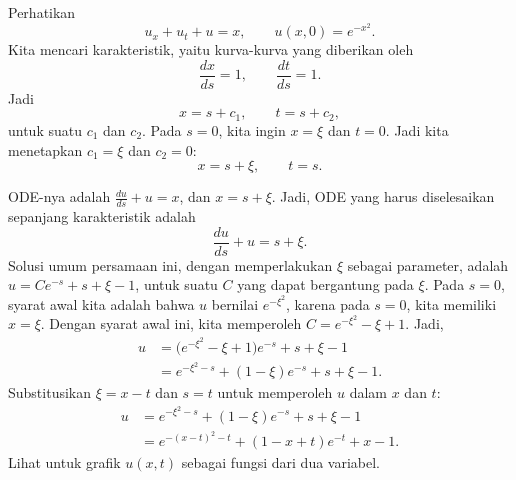 \begin{example}
Perhatikan
\begin{equation*}
u_x + u_t + u = x, \qquad u(x,0) = e^{-x^2} .
\end{equation*}
Kita mencari karakteristik, yaitu kurva-kurva yang diberikan oleh
\begin{equation*}
\frac{dx}{ds} = 1, \qquad \frac{dt}{ds} = 1 .
\end{equation*}
Jadi
\begin{equation*}
x = s + c_1, \qquad t = s+ c_2 ,
\end{equation*}
untuk suatu $c_1$ dan $c_2$.
Pada $s=0$, kita ingin $x=\xi$ dan $t=0$.  Jadi
kita menetapkan $c_1 = \xi$ dan $c_2 = 0$:
\begin{equation*}
x = s + \xi, \qquad t = s .
\end{equation*}

ODE-nya adalah $\frac{du}{ds} + u = x$, dan $x = s+\xi$. Jadi, ODE
yang harus diselesaikan sepanjang karakteristik adalah
\begin{equation*}
\frac{du}{ds} + u = s+ \xi .
\end{equation*}
Solusi umum persamaan ini, dengan memperlakukan $\xi$ sebagai parameter, adalah
$u = C e^{-s}+s+\xi-1$, untuk suatu $C$ yang dapat bergantung pada $\xi$.
Pada $s=0$, syarat awal kita adalah bahwa $u$ bernilai
$e^{-\xi^2}$, karena pada $s=0$, kita memiliki $x=\xi$.
Dengan syarat awal ini, kita memperoleh $C=e^{-\xi^2} - \xi +1$.  Jadi,
\begin{equation*}
\begin{split}
u & =
\bigl(e^{-\xi^2} - \xi +1\bigr) e^{-s}+s+\xi-1
\\
& =
e^{-\xi^2-s} + (1 - \xi) e^{-s} +s+\xi-1 .
\end{split}
\end{equation*}
Substitusikan $\xi = x-t$ dan $s=t$ untuk memperoleh $u$ dalam $x$ dan $t$:
\begin{equation*}
\begin{split}
u
& =
e^{-\xi^2-s} + (1 - \xi) e^{-s} +s+\xi-1
\\
& =
e^{-{(x-t)}^2-t} + (1 - x + t) e^{-t} +x-1 .
\end{split}
\end{equation*}
Lihat  untuk grafik $u(x,t)$ sebagai fungsi dari
dua variabel.
\begin{myfig}
\capstart
{}
\caption{Grafik solusi $u(x,t)$ dari
$u_x + u_t + u = x$,  $u(x,0) = e^{-x^2}$.\label{fopde:surfaceplot}}
\end{myfig}
\end{example}

